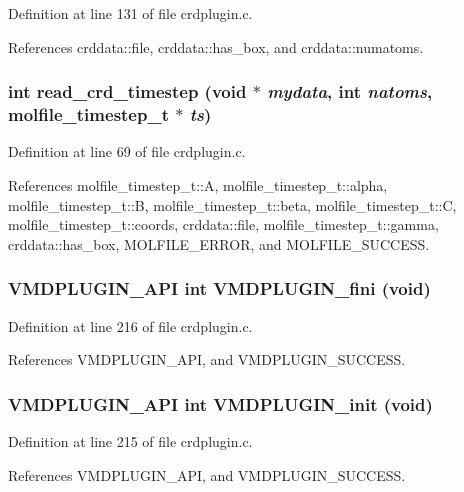 Definition at line 131 of file crdplugin.c.

References crddata::file, crddata::has\_\-box, and crddata::numatoms.
\subsubsection{\setlength{\rightskip}{0pt plus 5cm}int read\_\-crd\_\-timestep (void $\ast$ {\em mydata}, int {\em natoms}, {\bf molfile\_\-timestep\_\-t} $\ast$ {\em ts})\hspace{0.3cm}{\tt  [static]}}\label{crdplugin_8c_a3}




Definition at line 69 of file crdplugin.c.

References molfile\_\-timestep\_\-t::A, molfile\_\-timestep\_\-t::alpha, molfile\_\-timestep\_\-t::B, molfile\_\-timestep\_\-t::beta, molfile\_\-timestep\_\-t::C, molfile\_\-timestep\_\-t::coords, crddata::file, molfile\_\-timestep\_\-t::gamma, crddata::has\_\-box, MOLFILE\_\-ERROR, and MOLFILE\_\-SUCCESS.
\subsubsection{\setlength{\rightskip}{0pt plus 5cm}VMDPLUGIN\_\-API int VMDPLUGIN\_\-fini (void)}\label{crdplugin_8c_a9}




Definition at line 216 of file crdplugin.c.

References VMDPLUGIN\_\-API, and VMDPLUGIN\_\-SUCCESS.
\subsubsection{\setlength{\rightskip}{0pt plus 5cm}VMDPLUGIN\_\-API int VMDPLUGIN\_\-init (void)}\label{crdplugin_8c_a8}




Definition at line 215 of file crdplugin.c.

References VMDPLUGIN\_\-API, and VMDPLUGIN\_\-SUCCESS.
